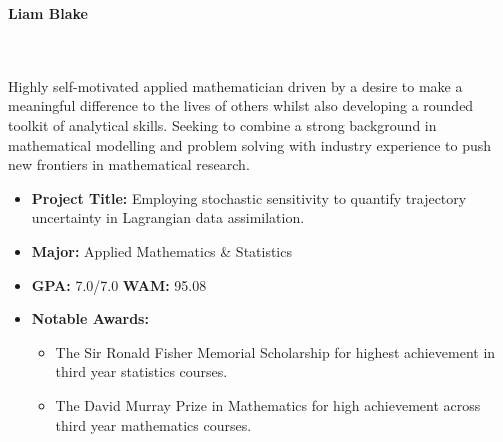 \documentclass[11pt,a4paper,academicons]{altacv}
\begin{document}

\begin{fullwidth}

	\begin{center}
		\color{emphasis}%
		{\fontsize{48pt}{48pt}\selectfont\bfseries{Liam Blake}}\\[0.25ex]

		\small {} \
		 \\[0.1ex]
		 \
	\end{center}
	\divider

	\normalsize
	Highly self-motivated applied mathematician driven by a desire to make a meaningful difference to the lives of others whilst also developing a rounded toolkit of analytical skills. Seeking to combine a strong background in mathematical modelling and problem solving with industry experience to push new frontiers in mathematical research.


	\begin{itemize}
		\item \textbf{Project Title:} Employing stochastic sensitivity to quantify trajectory uncertainty in Lagrangian data assimilation.



	\end{itemize}

	\divider

	\begin{itemize}
		\item \textbf{Major:} Applied Mathematics \& Statistics

		\item \textbf{GPA:} 7.0/7.0 \qquad \textbf{WAM:} 95.08

		\item \textbf{Notable Awards:}
		      \begin{itemize}
			      \item The Sir Ronald Fisher Memorial Scholarship for highest achievement in third year statistics courses.
			      \item The David Murray Prize in Mathematics for high achievement across third year mathematics courses.
		      \end{itemize}


\end{itemize}
\end{fullwidth}
\end{document}
